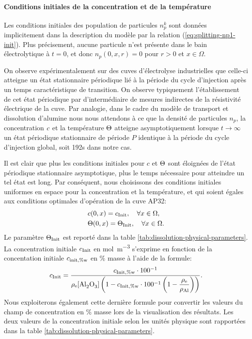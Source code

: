 \paragraph{Conditions initiales de la concentration et de la
  température}
Les conditions initiales des population de particules $n_p^k$ sont
données implicitement dans la description du modèle par la
relation (\ref{eq:splitting-np1-init}). Plus précisement, aucune
particule n'est présente dans le bain électrolytique à $t = 0$, et
donc $n_p(0, x,r) = 0$ pour $r>0$ et $x\in\Omega$.

On observe expérimentalement sur des cuves d'électrolyse industrielles
que celle-ci atteigne un état stationnaire périodique lié à la période
du cycle d'injection après un temps caractéristique de transition. On
observe typiquement l'établissement de cet état périodique par
d'intermédiaire de mesures indirectes de la résistivité électrique de
la cuve. Par analogie, dans le cadre du modèle de transport et
dissolution d'alumine nous nous attendons à ce que la densité de
particules $n_p$, la concentration $c$ et la température
$\Theta$ atteigne asymptotiquement lorsque $t\to\infty$ un état
périodique stationnaire de période $P$ identique à la période du
cycle d'injection global, soit \num{192}\si{\second} dans notre cas.

Il est clair que plus les conditions initiales pour $c$ et
$\Theta$ sont éloignées de l'état périodique stationnaire
asymptotique, plus le temps nécessaire pour atteindre un tel état est
long. Par conséquent, nous choisissons des conditions initiales
uniformes en espace pour la concentration et la température, et qui
soient égales aux conditions optimales d'opération de la cuve AP32:
\begin{align*}
  & c(0, x) = c_\text{Init},\quad\forall x\in\Omega,\\
  & \Theta(0, x) = \Theta_\text{Init},\quad\forall x\in\Omega.
\end{align*}
Le paramètre $\Theta_\text{Init}$ est reporté dans la table
\ref{tab:dissolution-physical-parameters}. La concentration initiale
$c_\text{Init}$ en \si{\mol\per\cubic\meter} s'exprime en fonction de la
concentation initiale $c_{\text{init},\%\mathrm w}$ en \% masse à
l'aide de la formule:
\begin{equation*}
  \cinit = \frac{\cinitwp \cdot
    100^{-1}}{\electrolytedensity[\cee{Al2O3}]\parent{1 - \cinitwp\cdot
      100^{-1}\parent{1 - \displaystyle\frac{\electrolytedensity}{\aluminadensity}}}}.
\end{equation*}
Nous exploiterons également cette dernière formule pour convertir les
valeurs du champ de concentration en \% masse lors de la visualisation
des résultats. Les deux valeurs de la concentration initiale selon les
unités physique sont rapportées dans la table
\ref{tab:dissolution-physical-parameters}.

